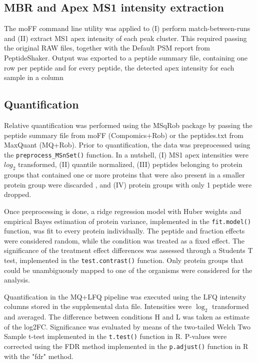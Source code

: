 \subsection{\ac{MBR} and Apex MS1 intensity extraction}

The moFF command line utility \cite{Argentini2016} was applied to (I) perform match-between-runs and (II) extract MS1 apex intensity of each peak cluster. This required passing the original RAW files, together with the Default PSM report from PeptideShaker. Output was exported to a peptide summary file, containing  one row per peptide and for every peptide, the detected apex intensity for each sample in a column

\subsection{Quantification}

Relative quantification was performed using the MSqRob package \cite{Goeminne2016} by passing the peptide summary file from moFF (Compomics+Rob) or the peptides.txt from MaxQuant (MQ+Rob). Prior to quantification, the data was preprocessed using the \texttt{preprocess\_MSnSet()} function. In a nutshell, (I) MS1 apex intensities were $log_2$ transformed, (II) quantile normalized, (III) peptides belonging to protein groups that contained one or more proteins that were also present in a smaller protein group were discarded \cite{Goeminne2016}, and (IV) protein groups with only 1 peptide were dropped.

Once preprocessing is done, a ridge regression model with Huber weights and empirical Bayes estimation of protein variance, implemented in the \texttt{fit.model()} function, was fit to every protein individually. The peptide and fraction effects were considered random, while the condition was treated as a fixed effect. The significance of the treatment effect differences was assessed through a Student\textquotesingle s T test, implemented in the \texttt{test.contrast()} function. Only protein groups that could be unambiguously mapped to one of the organisms were considered for the analysis.

Quantification in the MQ+LFQ pipeline was executed using the LFQ intensity columns stored in the supplemental data file. Intensities were $\log_2$ transformed and averaged. The difference between conditions H and L was taken as estimate of the log2FC. Significance was evaluated by means of the two-tailed Welch Two Sample t-test implemented in the \texttt{t.test()} function in R. P-values were corrected using the FDR method implemented in the \texttt{p.adjust()} function in R with the "fdr" method.


